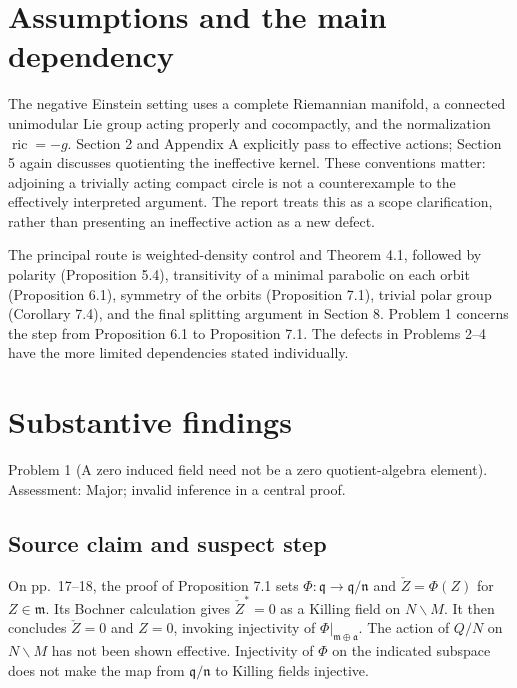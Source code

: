 \documentclass[10pt]{article}
\begin{document}
\section*{Assumptions and the main dependency}
The negative Einstein setting uses a complete Riemannian manifold, a connected unimodular Lie group acting properly and cocompactly, and the normalization \(\operatorname{ric}=-g\). Section 2 and Appendix A explicitly pass to effective actions; Section 5 again discusses quotienting the ineffective kernel. These conventions matter: adjoining a trivially acting compact circle is not a counterexample to the effectively interpreted argument. The report treats this as a scope clarification, rather than presenting an ineffective action as a new defect.\par
The principal route is weighted-density control and Theorem 4.1, followed by polarity (Proposition 5.4), transitivity of a minimal parabolic on each orbit (Proposition 6.1), symmetry of the orbits (Proposition 7.1), trivial polar group (Corollary 7.4), and the final splitting argument in Section 8. Problem 1 concerns the step from Proposition 6.1 to Proposition 7.1. The defects in Problems 2–4 have the more limited dependencies stated individually.\par
\section*{Substantive findings}
Problem 1 (A zero induced field need not be a zero quotient-algebra element).  Assessment: Major; invalid inference in a central proof.\par
\subsection*{Source claim and suspect step}
On pp. 17–18, the proof of Proposition 7.1 sets \(\Phi:\mathfrak q\to\mathfrak q/\mathfrak n\) and \(\check Z=\Phi(Z)\) for \(Z\in\mathfrak m\). Its Bochner calculation gives \(\check Z^{*}=0\) as a Killing field on \(N\backslash M\). It then concludes \(\check Z=0\) and \(Z=0\), invoking injectivity of \(\Phi|_{\mathfrak m\oplus\mathfrak a}\). The action of \(Q/N\) on \(N\backslash M\) has not been shown effective. Injectivity of \(\Phi\) on the indicated subspace does not make the map from \(\mathfrak q/\mathfrak n\) to Killing fields injective.\par
\end{document}
